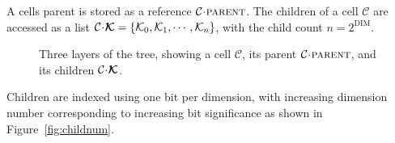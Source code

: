 \documentclass[twoside]{IIBproject}
\newcommand{\vect} [1] {\bm{#1}}
\newcommand{\acc}{{\mkern 0.5mu\cdot\mkern 0.5mu}}
\numberwithin{figure}{section}
\begin{document}
            A cells parent is stored as a reference $\mathcal{C}\acc\textproc{parent}$. The children of a cell $\mathcal{C}$ are accessed as a list $\mathcal{C}\acc\vect{\mathcal{K}}=\{\mathcal{K}_0,\mathcal{K}_1,\cdots,\mathcal{K}_n\}$, with the child count $n=2^\mathrm{DIM}$.

            \begin{figure}[!htbp]
                \centering
                
                \caption{Three layers of the tree, showing a cell $\mathcal{C}$, its parent $\mathcal{C}\acc\textproc{parent}$, and its children $\mathcal{C}\acc\vect{\mathcal{K}}$.}
                \label{fig:ftt-layerlinks}
            \end{figure}

            Children are indexed using one bit per dimension, with increasing dimension number corresponding to increasing bit significance as shown in Figure~\ref{fig:childnum}.
\end{document}
